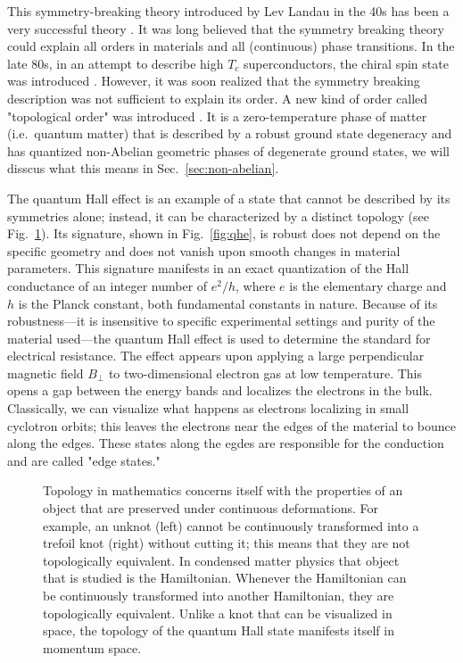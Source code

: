 This symmetry-breaking theory introduced by Lev Landau in the 40s has been a very successful theory \cite{Landau1937}.
It was long believed that the symmetry breaking theory could explain all orders in materials and all (continuous) phase transitions.
In the late 80s, in an attempt to describe high $T_c$ superconductors, the chiral spin state was introduced \cite{Kalmeyer1987}.
However, it was soon realized that the symmetry breaking description was not sufficient to explain its order.
A new kind of order called "topological order" was introduced \cite{Wen1989,XiaoGang1990}.
It is a zero-temperature phase of matter (i.e.~quantum matter) that is described by a robust ground state degeneracy and has quantized non-Abelian geometric phases of degenerate ground states, we will disscus what this means in Sec.~\ref{sec:non-abelian}.

The quantum Hall effect is an example of a state that cannot be described by its symmetries alone; instead, it can be characterized by a distinct topology (see Fig.~\ref{fig:knots}).
Its signature, shown in Fig.~\ref{fig:qhe}, is robust does not depend on the specific geometry and does not vanish upon smooth changes in material parameters.
This signature manifests in an exact quantization of the Hall conductance of an integer number of $e^2/h$, where $e$ is the elementary charge and $h$ is the Planck constant, both fundamental constants in nature.
Because of its robustness---it is insensitive to specific experimental settings and purity of the material used---the quantum Hall effect is used to determine the standard for electrical resistance.
The effect appears upon applying a large perpendicular magnetic field $B_\perp$ to two-dimensional electron gas at low temperature.
This opens a gap between the energy bands and localizes the electrons in the bulk.
Classically, we can visualize what happens as electrons localizing in small cyclotron orbits; this leaves the electrons near the edges of the material to bounce along the edges.
These states along the egdes are responsible for the conduction and are called "edge states."

\begin{figure}[!htb]
\centering
\caption{
Topology in mathematics concerns itself with the properties of an object that are preserved under continuous deformations.
For example, an unknot (left) cannot be continuously transformed into a trefoil knot (right) without cutting it; this means that they are not topologically equivalent.
In condensed matter physics that object that is studied is the Hamiltonian.
Whenever the Hamiltonian can be continuously transformed into another Hamiltonian, they are topologically equivalent.
Unlike a knot that can be visualized in space, the topology of the quantum Hall state manifests itself in momentum space.
\label{fig:knots}}
\end{figure}

